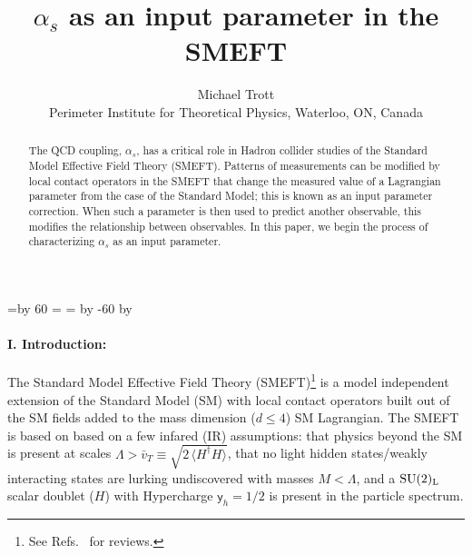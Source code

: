 \documentclass[twocolumn,nofootinbib,amsmath,amssymb,prl,aps,superscriptaddress,tightenlines,preprintnumbers]{revtex4}
\def\hyp{\mathsf{y}}
\begin{document}
\newcount\hour \newcount\minute
\hour=\time \divide \hour by 60
\minute=\time
{}=\hour \multiply {} by -60 \advance \minute by 
\newcommand{\mydate}{\ \today \ - \number\hour :00}


\title{$\alpha_s$ as an input parameter in the SMEFT}

\author{
Michael Trott \\
Perimeter Institute for Theoretical Physics, Waterloo, ON, Canada}

\begin{abstract}
The QCD coupling, $\alpha_s$, has a critical role in Hadron collider studies of the Standard Model Effective Field Theory (SMEFT).
Patterns of measurements can be modified by local contact operators
in the SMEFT that change the measured value of a Lagrangian parameter from the case of the Standard Model;
this is known as an input parameter correction.
When such a parameter is then used to predict another observable, this modifies the relationship between observables.
In this paper, we begin the process of characterizing $\alpha_s$ as an input parameter.
 \end{abstract}

\maketitle
\newpage

\paragraph{\bf I. Introduction:}
The Standard Model Effective Field Theory (SMEFT)\footnote{See Refs.~\cite{Brivio:2017vri,Isidori:2023pyp} for reviews.} is  a model independent extension
of the Standard Model (SM) with local contact operators built out of
the SM fields added to the mass dimension ($d \leq 4$) SM Lagrangian. The SMEFT is based on based on a few infared (IR)
assumptions: that physics beyond the SM
is present at scales $\Lambda >\bar{v}_T\equiv \sqrt{2 \, \langle H^\dagger H \rangle}$, that
no light hidden states/weakly interacting states are lurking undiscovered with masses $M < \Lambda$,
and a $\rm SU(2)_L$ scalar doublet ($H$) with Hypercharge $\hyp_h = 1/2$ is present in the particle spectrum.
\end{document}
